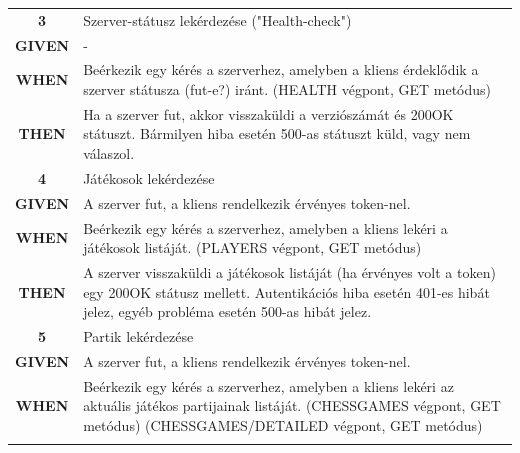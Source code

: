 \documentclass[twoside, a4paper, 12pt]{article}
\begin{document}
\begin{longtable}[c]{|c|p{14cm}|}
	\rowcolor[HTML]{CBCEFB} 
	\textbf{3}
	&	Szerver-státusz lekérdezése ("Health-check")
	\\ \nobreakhline
	
	\textbf{GIVEN} &
	-
	\\ \nobreakhline
	
	\textbf{WHEN} &
	Beérkezik egy kérés a szerverhez, amelyben a kliens érdeklődik a szerver státusza (fut-e?) iránt.
	(HEALTH végpont, GET metódus)
	\\
	\nobreakhline
	
	\textbf{THEN} &
	Ha a szerver fut, akkor visszaküldi a verziószámát és 200OK státuszt.
	Bármilyen hiba esetén 500-as státuszt küld, vagy nem válaszol.
	\\
	\hline
	
	\rowcolor[HTML]{CBCEFB} 
	\textbf{4}
	&	Játékosok lekérdezése
	\\ \nobreakhline
	
	\textbf{GIVEN} &
	A szerver fut, a kliens rendelkezik érvényes token-nel.
	\\ \nobreakhline
	
	\textbf{WHEN} &
	Beérkezik egy kérés a szerverhez, amelyben a kliens lekéri a játékosok listáját.
	(PLAYERS végpont, GET metódus)
	\\
	\nobreakhline
	
	\textbf{THEN} &
	A szerver visszaküldi a játékosok listáját (ha érvényes volt a token) egy 200OK státusz mellett.
	Autentikációs hiba esetén 401-es hibát jelez, egyéb probléma esetén 500-as hibát jelez.
	\\
	\hline
	
	\rowcolor[HTML]{CBCEFB} 
	\textbf{5}
	&	Partik lekérdezése
	\\ \nobreakhline
	
	\textbf{GIVEN} &
	A szerver fut, a kliens rendelkezik érvényes token-nel.
	\\ \nobreakhline
	
	\textbf{WHEN} &
	Beérkezik egy kérés a szerverhez, amelyben a kliens lekéri az aktuális játékos partijainak listáját.
	(CHESSGAMES végpont, GET metódus)
	(CHESSGAMES/DETAILED végpont, GET metódus)
	\\
	\nobreakhline
	

\end{longtable}
\end{document}
